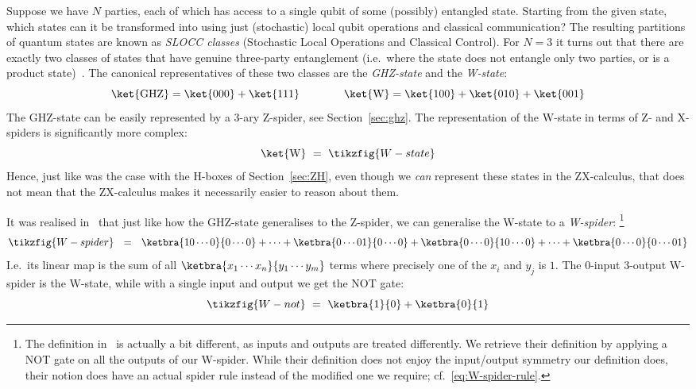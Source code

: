 \documentclass[a4paper,onecolumn,superscriptaddress,11pt,%
				unpublished,%
				allowfontchageintitle,%
				]{quantumarticle}
\begin{document}
Suppose we have $N$ parties, each of which has access to a single qubit of some (possibly) entangled state. Starting from the given state, which states can it be transformed into using just (stochastic) local qubit operations and classical communication? The resulting partitions of quantum states are known as \emph{SLOCC classes} (Stochastic Local Operations and Classical Control).
For $N=3$ it turns out that there are exactly two classes of states that have genuine three-party entanglement (i.e.~where the state does not entangle only two parties, or is a product state)~\cite{dur2000three}.
The canonical representatives of these two classes are the \emph{GHZ-state} and the \emph{W-state}:
\begin{equation}
	\ket{\text{GHZ}} = \ket{000} + \ket{111} \qquad \qquad \ket{\text{W}} = \ket{100} + \ket{010} + \ket{001}
\end{equation}
The GHZ-state can be easily represented by a 3-ary Z-spider, see Section~\ref{sec:ghz}. 
The representation of the W-state in terms of Z- and X-spiders is significantly more complex:
\begin{equation}
	\ket{\text{W}} \ = \ \tikzfig{W-state}
\end{equation}
Hence, just like was the case with the H-boxes of Section~\ref{sec:ZH}, even though we \emph{can} represent these states in the ZX-calculus, that does not mean that the ZX-calculus makes it necessarily easier to reason about them.

It was realised in~\cite{CoeckeKissinger2010compositional} that just like how the GHZ-state generalises to the Z-spider, we can generalise the W-state to a \emph{W-spider}:%
\footnote{The definition in~\cite{CoeckeKissinger2010compositional} is actually a bit different, as inputs and outputs are treated differently. We retrieve their definition by applying a NOT gate on all the outputs of our W-spider. While their definition does not enjoy the input/output symmetry our definition does, their notion does have an actual spider rule instead of the modified one we require; cf.~\eqref{eq:W-spider-rule}.}
\begin{equation}\label{eq:W-spider}
	\tikzfig{W-spider} \ \ = \ \ \ketbra{10\cdots 0}{0\cdots 0} + \cdots + \ketbra{0\cdots 0 1}{0\cdots 0} + \ketbra{0\cdots 0}{10\cdots 0} + \cdots + \ketbra{0\cdots 0}{0\cdots 0 1}
\end{equation}
I.e.~its linear map is the sum of all $\ketbra{x_1\cdots x_n}{y_1\cdots y_m}$ terms where precisely one of the $x_i$ and $y_j$ is $1$.
The 0-input 3-output W-spider is the W-state, while with a single input and output we get the NOT gate:
\begin{equation}
	\tikzfig{W-not} \ = \ \ketbra{1}{0} + \ketbra{0}{1}
\end{equation}
\end{document}
